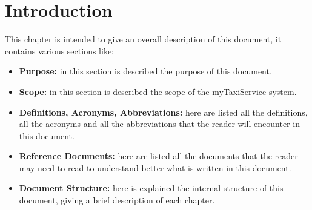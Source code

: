 \documentclass[../../dd.tex]{subfiles}
\begin{document}
	\chapter{Introduction}
		This chapter is intended to give an overall description of this document, it contains various sections like:
		\begin{itemize}
			\item \textbf{Purpose:} in this section is described the purpose of this document.
			\item \textbf{Scope:} in this section is described the scope of the myTaxiService system.
			\item \textbf{Definitions, Acronyms, Abbreviations:} here are listed all the definitions, all the acronyms and all the abbreviations that the reader will encounter in this document.
			\item \textbf{Reference Documents:} here are listed all the documents that the reader may need to read to understand better what is written in this document.
			\item \textbf{Document Structure:} here is explained the internal structure of this document, giving a brief description of each chapter.
		\end{itemize}

		

		

		

		

		
\end{document}
